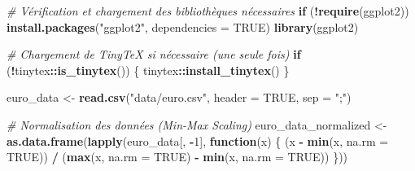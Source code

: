 \documentclass[
]{article}
\newenvironment{Shaded}{\begin{snugshade}}{\end{snugshade}}
\newcommand{\AttributeTok}[1]{\textcolor[rgb]{0.13,0.29,0.53}{#1}}
\newcommand{\CommentTok}[1]{\textcolor[rgb]{0.56,0.35,0.01}{\textit{#1}}}
\newcommand{\ConstantTok}[1]{\textcolor[rgb]{0.56,0.35,0.01}{#1}}
\newcommand{\ControlFlowTok}[1]{\textcolor[rgb]{0.13,0.29,0.53}{\textbf{#1}}}
\newcommand{\DecValTok}[1]{\textcolor[rgb]{0.00,0.00,0.81}{#1}}
\newcommand{\FunctionTok}[1]{\textcolor[rgb]{0.13,0.29,0.53}{\textbf{#1}}}
\newcommand{\NormalTok}[1]{#1}
\newcommand{\OtherTok}[1]{\textcolor[rgb]{0.56,0.35,0.01}{#1}}
\newcommand{\SpecialCharTok}[1]{\textcolor[rgb]{0.81,0.36,0.00}{\textbf{#1}}}
\newcommand{\StringTok}[1]{\textcolor[rgb]{0.31,0.60,0.02}{#1}}
\begin{document}
\begin{Shaded}
\begin{Highlighting}[]
\CommentTok{\# Vérification et chargement des bibliothèques nécessaires}
\ControlFlowTok{if}\NormalTok{ (}\SpecialCharTok{!}\FunctionTok{require}\NormalTok{(ggplot2)) }\FunctionTok{install.packages}\NormalTok{(}\StringTok{"ggplot2"}\NormalTok{, }\AttributeTok{dependencies =} \ConstantTok{TRUE}\NormalTok{)}
\FunctionTok{library}\NormalTok{(ggplot2)}

\CommentTok{\# Chargement de TinyTeX si nécessaire (une seule fois)}
\ControlFlowTok{if}\NormalTok{ (}\SpecialCharTok{!}\NormalTok{tinytex}\SpecialCharTok{::}\FunctionTok{is\_tinytex}\NormalTok{()) \{}
\NormalTok{  tinytex}\SpecialCharTok{::}\FunctionTok{install\_tinytex}\NormalTok{()}
\NormalTok{\}}
\end{Highlighting}
\end{Shaded}

\begin{Shaded}
\begin{Highlighting}[]
\NormalTok{euro\_data }\OtherTok{\textless{}{-}} \FunctionTok{read.csv}\NormalTok{(}\StringTok{"data/euro.csv"}\NormalTok{, }\AttributeTok{header =} \ConstantTok{TRUE}\NormalTok{, }\AttributeTok{sep =} \StringTok{";"}\NormalTok{)}

\CommentTok{\# Normalisation des données (Min{-}Max Scaling)}
\NormalTok{euro\_data\_normalized }\OtherTok{\textless{}{-}} \FunctionTok{as.data.frame}\NormalTok{(}\FunctionTok{lapply}\NormalTok{(euro\_data[, }\SpecialCharTok{{-}}\DecValTok{1}\NormalTok{], }\ControlFlowTok{function}\NormalTok{(x) \{}
\NormalTok{  (x }\SpecialCharTok{{-}} \FunctionTok{min}\NormalTok{(x, }\AttributeTok{na.rm =} \ConstantTok{TRUE}\NormalTok{)) }\SpecialCharTok{/}\NormalTok{ (}\FunctionTok{max}\NormalTok{(x, }\AttributeTok{na.rm =} \ConstantTok{TRUE}\NormalTok{) }\SpecialCharTok{{-}} \FunctionTok{min}\NormalTok{(x, }\AttributeTok{na.rm =} \ConstantTok{TRUE}\NormalTok{))}
\NormalTok{\}))}
\end{Highlighting}
\end{Shaded}
\end{document}
